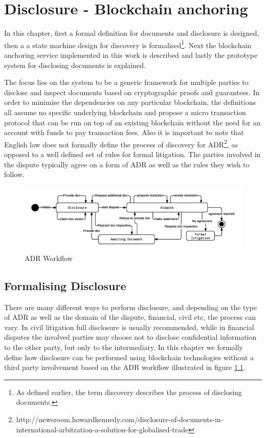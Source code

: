 \documentclass[12pt,msc,a4paper,oneside]{ucl_thesis}
\begin{document}
\chapter{Disclosure - Blockchain anchoring} \label{chapter:anchoring_data_into_the_blockchain}
In this chapter, first a formal definition for documents and disclosure is designed, then a a state machine design for discovery is formalised\footnote{As defined earlier, the term discovery describes the process of disclosing documents.}. Next the blockchain anchoring service implemented in this work is described and lastly the prototype system for disclosing documents is explained. 

The focus lies on the system to be a generic framework for multiple parties to disclose and inspect documents based on cryptographic proofs and guarantees. In order to minimise the dependencies on any particular blockchain, the definitions all assume no specific underlying blockchain and propose a micro transaction protocol that can be run on top of an existing blockchain without the need for an account with funds to pay transaction fees. Also it is important to note that English law does not formally define the process of discovery for ADR\footnote{http://newsroom.howardkennedy.com/disclosure-of-documents-in-international-arbitration-a-solution-for-globalised-trade}, as opposed to a well defined set of rules for formal litigation. The parties involved in the dispute typically agree on a form of ADR as well as the rules they wish to follow. 

\begin{figure}
    \includegraphics[width=1.0\textwidth]{./figures/adr_workflow.png}
    \caption{ADR Workflow}
    \label{fig:adr_workflow}
\end{figure}

\section{Formalising Disclosure} \label{sec:formalising_disclosure}
There are many different ways to perform disclosure, and depending on the type of ADR as well as the domain of the dispute, financial, civil etc, the process can vary. In civil litigation full disclosure is usually recommended, while in financial disputes the involved parties may choose not to disclose confidential information to the other party, but only to the intermediary. In this chapter we formally define how disclosure can be performed using blockchain technologies without a third party involvement based on the ADR workflow illustrated in figure \ref{fig:adr_workflow}.
\end{document}
